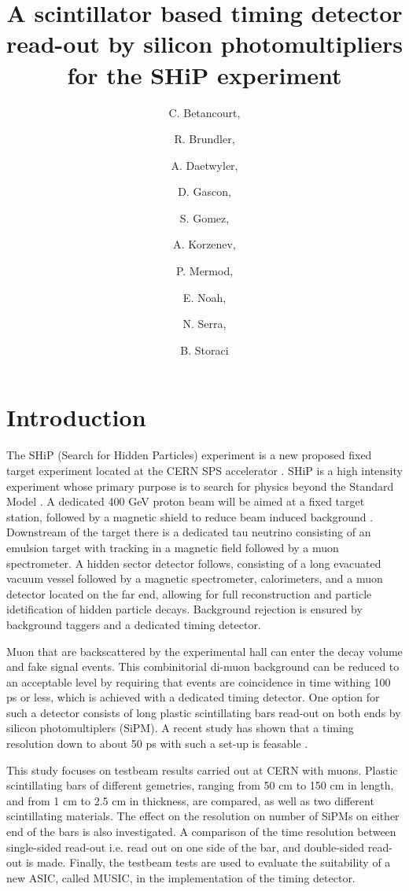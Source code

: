 \documentclass[a4paper,11pt]{article}
\title{A scintillator based timing detector read-out by silicon photomultipliers for the SHiP experiment}
\author[a,1]{C. Betancourt,\note{Corresponding author.}}
\author[a]{R. Brundler,}
\author[a]{A. Daetwyler,}
\author[b]{D. Gascon,}
\author[b]{S. Gomez,}
\author[c]{A. Korzenev,}
\author[c]{P. Mermod,}
\author[c]{E. Noah,}
\author[a]{N. Serra,}
\author[a]{B. Storaci}
\affiliation[a]{Universit\"{a}t Z\"{u}rich}
\affiliation[b]{Universitat de Barcelona}
\affiliation[c]{Universit\'{e} de Gen\`{e}ve}
\begin{document}
\maketitle
\flushbottom

\section{Introduction}
\label{sec:intro}

The SHiP (Search for Hidden Particles) experiment is a new proposed fixed target experiment located at the CERN SPS accelerator \cite{a}. SHiP is a high intensity experiment whose primary purpose is to search for physics beyond the Standard Model \cite{b}. A dedicated 400 GeV proton beam will be aimed at a fixed target station, followed by a magnetic shield to reduce beam induced background \cite{c}. Downstream of the target there is a dedicated tau neutrino consisting of an emulsion target with tracking in a magnetic field followed by a muon spectrometer. A hidden sector detector follows, consisting of a long evacuated vacuum vessel followed by a magnetic spectrometer, calorimeters, and a muon detector located on the far end, allowing for full reconstruction and particle idetification of hidden particle decays. Background rejection is ensured by background taggers and a dedicated timing detector.

Muon that are backscattered by the experimental hall can enter the decay volume and fake signal events. This combinitorial di-muon background can be reduced to an acceptable level by requiring that events are coincidence in time withing 100 ps or less, which is achieved with a dedicated timing detector. One option for such a detector consists of long plastic scintillating bars read-out on both ends by silicon photomultiplers (SiPM). A recent study has shown that a timing resolution down to about 50 ps with such a set-up is feasable \cite{d}.

This study focuses on testbeam results carried out at CERN with muons. Plastic scintillating bars of different gemetries, ranging from 50 cm to 150 cm in length, and from 1 cm to 2.5 cm in thickness, are compared, as well as two different scintillating materials. The effect on the resolution on number of SiPMs on either end of the bars is also investigated. A comparison of the time resolution between single-sided read-out i.e. read out on one side of the bar, and double-sided read-out is made. Finally, the testbeam tests are used to evaluate the suitability of a new ASIC, called MUSIC, in the implementation of the timing detector.
\end{document}
